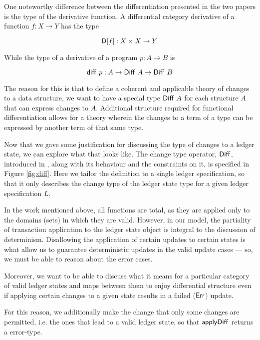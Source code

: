 One noteworthy difference between the differentiation presented in the two papers is
the type of the derivative function. A differential category derivative of a
function $f : X \to Y$ has the type

\[ \mathsf{D}[f] : X \times X \to Y \]

While the type of a derivative of a program $p : A \to B$ is

\[ \mathsf{diff}~p : A \to \mathsf{Diff}~A \to \mathsf{Diff}~B \]

The reason for this is that to define a coherent and applicable theory of changes
to a data structure, we want to have a special type $\mathsf{Diff}~A$ for each
structure $A$ that can express changes to $A$. Additional structure required
for functional differentiation allows for a theory wherein the changes to a term of a type
can be expressed by another term of that same type.

Now that we gave some justification for discussing the type of changes to a ledger
state, we can explore what that looks like. The change type operator, $\mathsf{Diff}$, introduced
in \cite{changes}, along with its behaviour and the constraints on it, is specified in Figure \ref{fig:diff}.
Here we tailor the definition to a single ledger specification, so that it only
describes the change type of the ledger state type for a given ledger specification $L$.

In the work mentioned above, all functions are total, as they are applied only
to the domains (sets) in which they are valid.
However, in our model, the partiality of transaction application
to the ledger state object is integral to the discussion of determinism.
Disallowing the application of certain updates to certain states is what
allow us to guarantee deterministic updates in the valid update cases --- so, we
must be able to reason about the error cases.

Moreover, we want to be able to discuss
what it means for a particular category of valid ledger states and maps between them
to enjoy differential structure even if applying certain changes to a given
state results in a failed ($\mathsf{Err}$) update.

For this reason, we additionally make the change that only some changes are permitted, i.e. the
ones that lead to a valid ledger state, so that $\mathsf{applyDiff}$ returns
a error-type.

